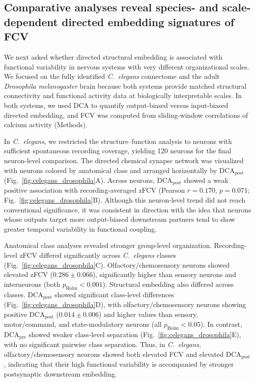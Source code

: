 \documentclass[9pt,twocolumn,twoside]{pnas-new}
\begin{document}
\subsection*{Comparative analyses reveal species- and scale-dependent directed embedding signatures of FCV}

We next asked whether directed structural embedding is associated with functional variability in nervous systems with very different organizational scales. We focused on the fully identified \textit{C.~elegans} connectome \citep{Cook2019,AtanasKim2023} and the adult \textit{Drosophila melanogaster} brain \citep{Dorkenwald2024FlyWire,Turner2021Branson999} because both systems provide matched structural connectivity and functional activity data at biologically interpretable scales. In both systems, we used DCA to quantify output-biased versus input-biased directed embedding, and FCV was computed from sliding-window correlations of calcium activity (Methods).

In \textit{C.~elegans}, we restricted the structure--function analysis to neurons with sufficient spontaneous recording coverage, yielding 120 neurons for the final neuron-level comparison. The directed chemical synapse network was visualized with neurons colored by anatomical class and arranged horizontally by $\mathrm{DCA}_{\mathrm{post}}$ (Fig.~\ref{fig:celegans_drosophila}A). Across neurons, $\mathrm{DCA}_{\mathrm{post}}$ showed a weak positive association with recording-averaged zFCV (Pearson $r = 0.170$, $p = 0.071$; Fig.~\ref{fig:celegans_drosophila}B). Although this neuron-level trend did not reach conventional significance, it was consistent in direction with the idea that neurons whose outputs target more output-biased downstream partners tend to show greater temporal variability in functional coupling.

Anatomical class analyses revealed stronger group-level organization. Recording-level zFCV differed significantly across \textit{C.~elegans} classes (Fig.~\ref{fig:celegans_drosophila}C). Olfactory/chemosensory neurons showed elevated zFCV ($0.286 \pm 0.066$), significantly higher than sensory neurons and interneurons (both $p_{\mathrm{Holm}} < 0.001$). Structural embedding also differed across classes. $\mathrm{DCA}_{\mathrm{post}}$ showed significant class-level differences (Fig.~\ref{fig:celegans_drosophila}D), with olfactory/chemosensory neurons showing positive $\mathrm{DCA}_{\mathrm{post}}$ ($0.014 \pm 0.006$) and higher values than sensory, motor/command, and state-modulatory neurons (all $p_{\mathrm{Holm}} < 0.05$). In contrast, $\mathrm{DCA}_{\mathrm{pre}}$ showed weaker class-level separation (Fig.~\ref{fig:celegans_drosophila}E), with no significant pairwise class separation. Thus, in \textit{C.~elegans}, olfactory/chemosensory neurons showed both elevated FCV and elevated $\mathrm{DCA}_{\mathrm{post}}$, indicating that their high functional variability is accompanied by stronger postsynaptic downstream embedding.
\end{document}
